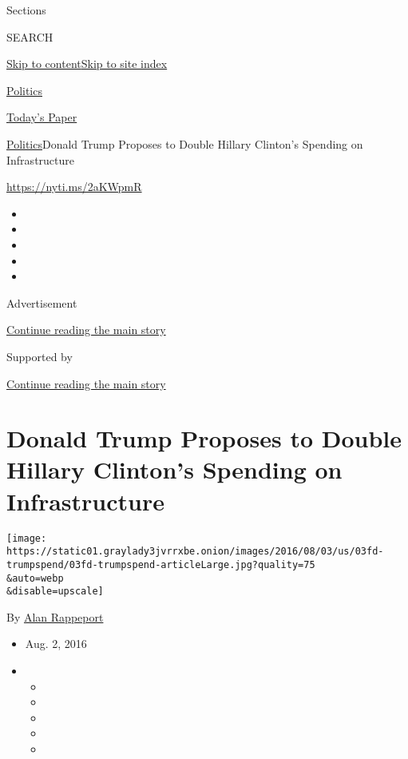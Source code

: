 Sections

SEARCH

\protect\hyperlink{site-content}{Skip to
content}\protect\hyperlink{site-index}{Skip to site index}

\href{https://www.nytimes3xbfgragh.onion/section/politics}{Politics}

\href{https://myaccount.nytimes3xbfgragh.onion/auth/login?response_type=cookie\&client_id=vi}{}

\href{https://www.nytimes3xbfgragh.onion/section/todayspaper}{Today's
Paper}

\href{/section/politics}{Politics}\textbar{}Donald Trump Proposes to
Double Hillary Clinton's Spending on Infrastructure

\url{https://nyti.ms/2aKWpmR}

\begin{itemize}
\item
\item
\item
\item
\item
\end{itemize}

Advertisement

\protect\hyperlink{after-top}{Continue reading the main story}

Supported by

\protect\hyperlink{after-sponsor}{Continue reading the main story}

\hypertarget{donald-trump-proposes-to-double-hillary-clintons-spending-on-infrastructure}{%
\section{Donald Trump Proposes to Double Hillary Clinton's Spending on
Infrastructure}\label{donald-trump-proposes-to-double-hillary-clintons-spending-on-infrastructure}}

\texttt{[image: https://static01.graylady3jvrrxbe.onion/images/2016/08/03/us/03fd-trumpspend/03fd-trumpspend-articleLarge.jpg?quality=75\\\&auto=webp\\\&disable=upscale]}

By \href{https://www.nytimes3xbfgragh.onion/by/alan-rappeport}{Alan
Rappeport}

\begin{itemize}
\item
  Aug. 2, 2016
\item
  \begin{itemize}
  \item
  \item
  \item
  \item
  \item
  \end{itemize}
\end{itemize}

